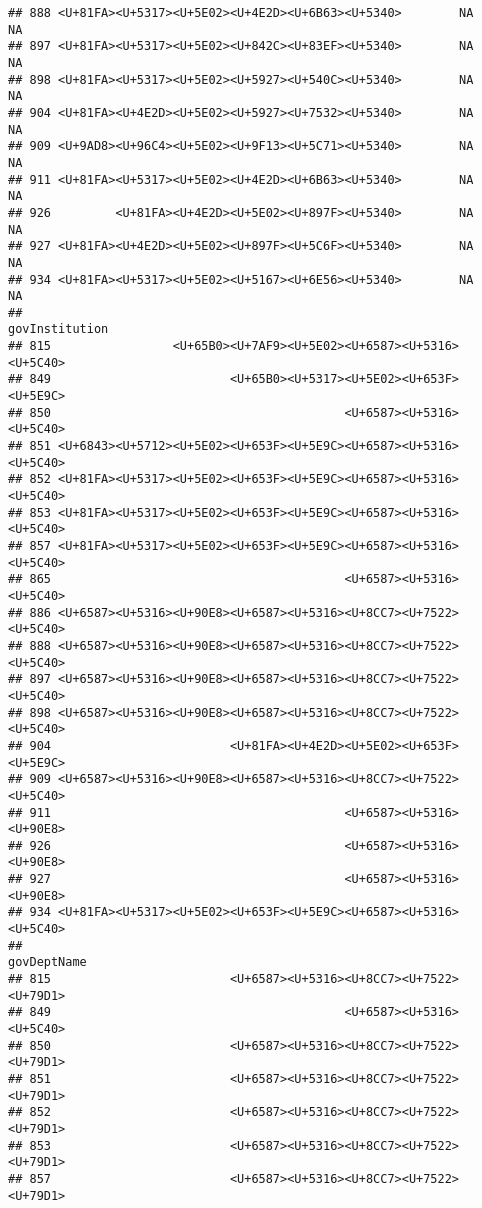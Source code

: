 \documentclass[
]{article}
\begin{document}
\begin{verbatim}
## 888 <U+81FA><U+5317><U+5E02><U+4E2D><U+6B63><U+5340>        NA       NA
## 897 <U+81FA><U+5317><U+5E02><U+842C><U+83EF><U+5340>        NA       NA
## 898 <U+81FA><U+5317><U+5E02><U+5927><U+540C><U+5340>        NA       NA
## 904 <U+81FA><U+4E2D><U+5E02><U+5927><U+7532><U+5340>        NA       NA
## 909 <U+9AD8><U+96C4><U+5E02><U+9F13><U+5C71><U+5340>        NA       NA
## 911 <U+81FA><U+5317><U+5E02><U+4E2D><U+6B63><U+5340>        NA       NA
## 926         <U+81FA><U+4E2D><U+5E02><U+897F><U+5340>        NA       NA
## 927 <U+81FA><U+4E2D><U+5E02><U+897F><U+5C6F><U+5340>        NA       NA
## 934 <U+81FA><U+5317><U+5E02><U+5167><U+6E56><U+5340>        NA       NA
##                                                       govInstitution
## 815                 <U+65B0><U+7AF9><U+5E02><U+6587><U+5316><U+5C40>
## 849                         <U+65B0><U+5317><U+5E02><U+653F><U+5E9C>
## 850                                         <U+6587><U+5316><U+5C40>
## 851 <U+6843><U+5712><U+5E02><U+653F><U+5E9C><U+6587><U+5316><U+5C40>
## 852 <U+81FA><U+5317><U+5E02><U+653F><U+5E9C><U+6587><U+5316><U+5C40>
## 853 <U+81FA><U+5317><U+5E02><U+653F><U+5E9C><U+6587><U+5316><U+5C40>
## 857 <U+81FA><U+5317><U+5E02><U+653F><U+5E9C><U+6587><U+5316><U+5C40>
## 865                                         <U+6587><U+5316><U+5C40>
## 886 <U+6587><U+5316><U+90E8><U+6587><U+5316><U+8CC7><U+7522><U+5C40>
## 888 <U+6587><U+5316><U+90E8><U+6587><U+5316><U+8CC7><U+7522><U+5C40>
## 897 <U+6587><U+5316><U+90E8><U+6587><U+5316><U+8CC7><U+7522><U+5C40>
## 898 <U+6587><U+5316><U+90E8><U+6587><U+5316><U+8CC7><U+7522><U+5C40>
## 904                         <U+81FA><U+4E2D><U+5E02><U+653F><U+5E9C>
## 909 <U+6587><U+5316><U+90E8><U+6587><U+5316><U+8CC7><U+7522><U+5C40>
## 911                                         <U+6587><U+5316><U+90E8>
## 926                                         <U+6587><U+5316><U+90E8>
## 927                                         <U+6587><U+5316><U+90E8>
## 934 <U+81FA><U+5317><U+5E02><U+653F><U+5E9C><U+6587><U+5316><U+5C40>
##                                                          govDeptName
## 815                         <U+6587><U+5316><U+8CC7><U+7522><U+79D1>
## 849                                         <U+6587><U+5316><U+5C40>
## 850                         <U+6587><U+5316><U+8CC7><U+7522><U+79D1>
## 851                         <U+6587><U+5316><U+8CC7><U+7522><U+79D1>
## 852                         <U+6587><U+5316><U+8CC7><U+7522><U+79D1>
## 853                         <U+6587><U+5316><U+8CC7><U+7522><U+79D1>
## 857                         <U+6587><U+5316><U+8CC7><U+7522><U+79D1>

\end{verbatim}
\end{document}
